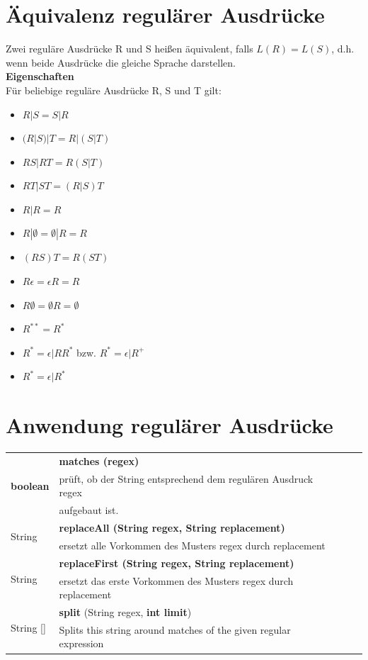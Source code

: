 \documentclass{scrreprt}
\begin{document}
\section{Äquivalenz regulärer Ausdrücke}
Zwei reguläre Ausdrücke R und S heißen äquivalent, falls $L(R) = L(S)$, d.h. wenn beide Ausdrücke die gleiche Sprache darstellen.
\\\textbf{Eigenschaften}
\\Für beliebige reguläre Ausdrücke R, S und T gilt:
\begin{itemize}
    \item $R|S = S|R$
    \item $(R|S)|T = R|(S|T)$
    \item $RS|RT = R(S|T)$
    \item $RT|ST = (R|S)T$
    \item $R|R = R$
    \item $R| \emptyset = \emptyset|R = R$
    \item $(RS)T = R(ST)$
    \item $R \epsilon = \epsilon R = R$
    \item $R \emptyset = \emptyset R = \emptyset$
    \item $R^{**} = R^{*}$
    \item $R^{*} = \epsilon | RR^{*}$ bzw. $R^{*} = \epsilon | R^{+}$
    \item $R^{*} = \epsilon | R^{*}$
\end{itemize}
\section{Anwendung regulärer Ausdrücke}
\begin{tabularx}{\textwidth}{p{}|l|X|l}
    \multirow{3}{*}{\textbf{boolean} }
            & \textbf{matches (regex)}\\
            & prüft, ob der String entsprechend dem regulären Ausdruck regex\\
            & aufgebaut ist.\\
    \hline
    \multirow{2}{*}{String}
            & \textbf{replaceAll (String regex, String replacement)}\\
            & ersetzt alle Vorkommen des Musters regex durch replacement\\
    \hline
    \multirow{2}{*}{String}
            & \textbf{replaceFirst (String regex, String replacement)}\\
            & ersetzt das erste Vorkommen des Musters regex durch replacement\\
    \hline
    \multirow{2}{*}{String []}
            & \textbf{split} (String regex, \textbf{int limit})\\
            & Splits this string around matches of the given regular expression\\
\end{tabularx}
\pagebreak
\end{document}
